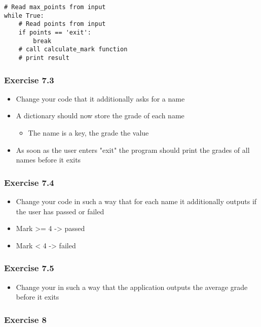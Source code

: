 \documentclass[10pt, a4paper]{beamer} %
\begin{document}
{\begin{frame}[c, fragile, allowframebreaks]
	{
	\mdseries
	\begin{lstlisting}
# Read max_points from input
while True:
    # Read points from input
    if points == 'exit':
        break
    # call calculate_mark function
    # print result
\end{lstlisting}
	}
\end{frame}
\begin{frame}\frametitle{Exercise 7.3}

	\begin{itemize}
		\item Change your code that it additionally asks for a name
		\item A dictionary should now store the grade of each name
		      \begin{itemize}
			      \item The name is a key, the grade the value
		      \end{itemize}
		\item As soon as the user enters "exit" the program should print the grades of all names before it exits
	\end{itemize}

\end{frame}
\begin{frame}\frametitle{Exercise 7.4}

	\begin{itemize}
		\item Change your code in such a way that for each name it additionally outputs if the user has passed or failed
		\item Mark >= 4 -> passed
		\item Mark < 4 -> failed
	\end{itemize}
\end{frame}

\begin{frame}\frametitle{Exercise 7.5}

	\begin{itemize}
		\item Change your in such a way that the application outputs the average grade before it exits
	\end{itemize}


\end{frame}

\begin{frame}[c, fragile]\frametitle{Exercise 8}


\end{frame}}
\end{document}
